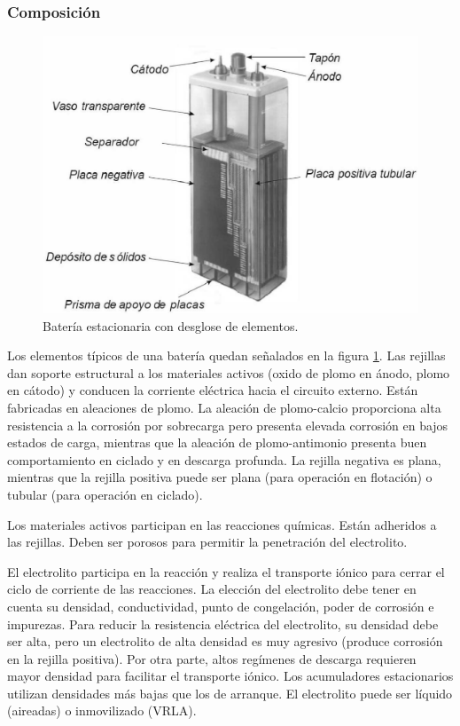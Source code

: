 \subsubsection{Composición}

%
\begin{figure}
\begin{centering}
\includegraphics[scale=0.4]{../figs/AcumuladorBN}
\end{centering}

\caption{Batería estacionaria con desglose de elementos.\label{fig:Bateria-estacionaria}}

\end{figure}


Los elementos típicos de una batería quedan señalados en la figura
\ref{fig:Bateria-estacionaria}. Las rejillas dan soporte estructural
a los materiales activos (oxido de plomo en ánodo, plomo en cátodo)
y conducen la corriente eléctrica hacia el circuito externo. Están
fabricadas en aleaciones de plomo. La aleación de plomo-calcio proporciona
alta resistencia a la corrosión por sobrecarga pero presenta elevada
corrosión en bajos estados de carga, mientras que la aleación de plomo-antimonio
presenta buen comportamiento en ciclado y en descarga profunda. La
rejilla negativa es plana, mientras que la rejilla positiva puede
ser plana (para operación en flotación) o tubular (para operación
en ciclado).

Los materiales activos participan en las reacciones químicas. Están
adheridos a las rejillas. Deben ser porosos para permitir la penetración
del electrolito.

El electrolito participa en la reacción y realiza el transporte iónico
para cerrar el ciclo de corriente de las reacciones. La elección del
electrolito debe tener en cuenta su densidad, conductividad, punto
de congelación, poder de corrosión e impurezas. Para reducir la resistencia
eléctrica del electrolito, su densidad debe ser alta, pero un electrolito
de alta densidad es muy agresivo (produce corrosión en la rejilla
positiva). Por otra parte, altos regímenes de descarga requieren mayor
densidad para facilitar el transporte iónico. Los acumuladores estacionarios
utilizan densidades más bajas que los de arranque. El electrolito
puede ser líquido (aireadas) o inmovilizado (VRLA).

